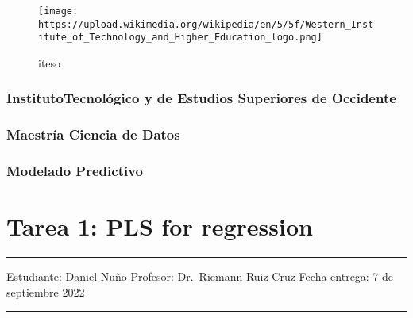 \documentclass[
  letterpaper,
  DIV=11,
  numbers=noendperiod]{scrartcl}
\author{}
\date{}
\begin{document}
\ifdefined\Shaded\renewenvironment{Shaded}{\begin{tcolorbox}[borderline west={3pt}{0pt}{shadecolor}, enhanced, interior hidden, breakable, boxrule=0pt, sharp corners, frame hidden]}{\end{tcolorbox}}\fi

\begin{figure}

{\centering \texttt{[image: https://upload.wikimedia.org/wikipedia/en/5/5f/Western\_Institute\_of\_Technology\_and\_Higher\_Education\_logo.png]}

}

\caption{iteso}

\end{figure}

\hypertarget{institutotecnoluxf3gico-y-de-estudios-superiores-de-occidente}{%
\subsubsection{InstitutoTecnológico y de Estudios Superiores de
Occidente}\label{institutotecnoluxf3gico-y-de-estudios-superiores-de-occidente}}

\hypertarget{maestruxeda-ciencia-de-datos}{%
\subsubsection{Maestría Ciencia de
Datos}\label{maestruxeda-ciencia-de-datos}}

\hypertarget{modelado-predictivo}{%
\subsubsection{Modelado Predictivo}\label{modelado-predictivo}}

\hypertarget{tarea-1-pls-for-regression}{%
\section{Tarea 1: PLS for regression}\label{tarea-1-pls-for-regression}}

\begin{center}\rule{0.5\linewidth}{0.5pt}\end{center}

Estudiante: Daniel Nuño Profesor: Dr.~Riemann Ruiz Cruz Fecha entrega: 7
de septiembre 2022

\begin{center}\rule{0.5\linewidth}{0.5pt}\end{center}
\end{document}
